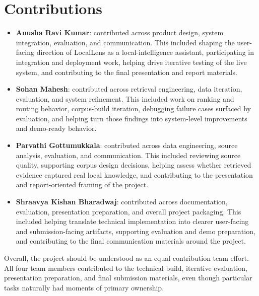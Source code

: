 \documentclass[11pt]{article}
\begin{document}
\section{Contributions}
\begin{itemize}[leftmargin=*]
    \item \textbf{Anusha Ravi Kumar}: contributed across product design, system integration, evaluation, and communication. This included shaping the user-facing direction of LocalLens as a local-intelligence assistant, participating in integration and deployment work, helping drive iterative testing of the live system, and contributing to the final presentation and report materials.
    \item \textbf{Sohan Mahesh}: contributed across retrieval engineering, data iteration, evaluation, and system refinement. This included work on ranking and routing behavior, corpus-build iteration, debugging failure cases surfaced by evaluation, and helping turn those findings into system-level improvements and demo-ready behavior.
    \item \textbf{Parvathi Gottumukkala}: contributed across data engineering, source analysis, evaluation, and communication. This included reviewing source quality, supporting corpus design decisions, helping assess whether retrieved evidence captured real local knowledge, and contributing to the presentation and report-oriented framing of the project.
    \item \textbf{Shraavya Kishan Bharadwaj}: contributed across documentation, evaluation, presentation preparation, and overall project packaging. This included helping translate technical implementation into clearer user-facing and submission-facing artifacts, supporting evaluation and demo preparation, and contributing to the final communication materials around the project.
\end{itemize}

Overall, the project should be understood as an equal-contribution team effort. All four team members contributed to the technical build, iterative evaluation, presentation preparation, and final submission materials, even though particular tasks naturally had moments of primary ownership.
\end{document}
